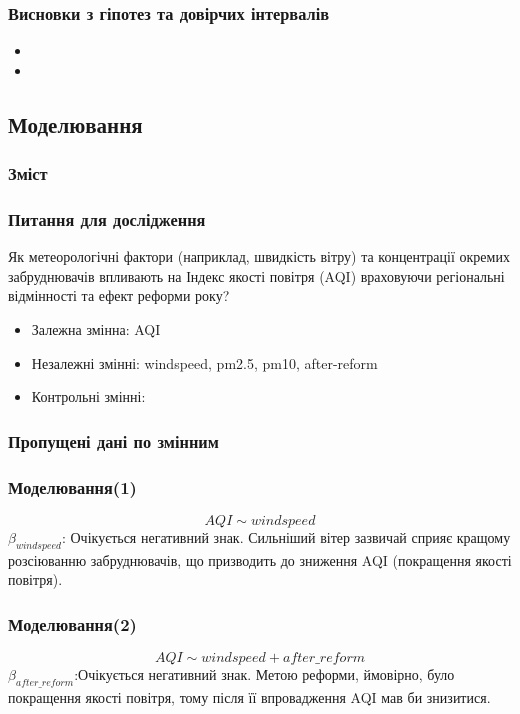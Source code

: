 ﻿\documentclass{beamer}
\begin{document}
\begin{frame}
  \frametitle{Висновки з гіпотез та довірчих інтервалів}
  \begin{itemize}
  \item 
  \item 

  \end{itemize}
\end{frame}

\begin{frame}
  \section{Моделювання}

  \frametitle{Зміст}
  \tableofcontents[currentsection]
\end{frame}

\begin{frame}
  \frametitle{Питання для дослідження}
  Як метеорологічні фактори (наприклад, швидкість вітру) та концентрації окремих 
  забруднювачів впливають на Індекс якості повітря (AQI) 
  враховуючи регіональні відмінності та ефект реформи року?

  \begin{itemize}
    \item Залежна змінна: AQI
    \item Незалежні змінні: windspeed, pm2.5, pm10, after-reform 
    \item Контрольні змінні:  
  \end{itemize}
\end{frame}

\begin{frame}
  \frametitle{Пропущені дані по змінним}
   
\end{frame}

\begin{frame}
  \frametitle{Моделювання(1)}
   $$AQI \sim windspeed $$
   $\beta_{windspeed}$: Очікується негативний знак. 
  Сильніший вітер зазвичай сприяє кращому розсіюванню забруднювачів, 
  що призводить до зниження AQI (покращення якості повітря).
\end{frame}

\begin{frame}
  \frametitle{Моделювання(2)}
   $$AQI \sim windspeed + after\_reform $$
   $\beta_{after\_reform}$:Очікується негативний знак. 
   Метою реформи, ймовірно, було покращення якості повітря,
   тому після її впровадження AQI мав би знизитися.
\end{frame}
\end{document}
